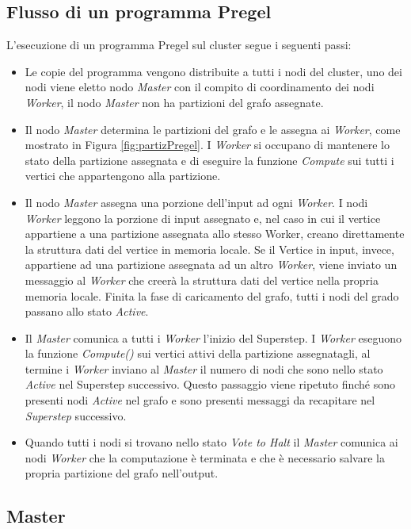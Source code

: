 \documentclass[LaM,binding=0.6cm]{sapthesis}
\begin{document}
\subsection{Flusso di un programma Pregel}

L'esecuzione di un programma Pregel sul cluster segue i seguenti passi:
\begin{itemize}
\item Le copie del programma vengono distribuite a tutti i nodi del cluster, uno dei nodi viene eletto nodo \textit{Master} con il compito di coordinamento dei nodi \textit{Worker}, il nodo \textit{Master }non ha partizioni del grafo assegnate.
\item Il nodo \textit{Master} determina le partizioni del grafo e le assegna ai \textit{Worker}, come  mostrato in Figura \ref{fig:partizPregel}. I \textit{Worker} si occupano di mantenere lo stato della partizione assegnata e di eseguire la funzione \textit{Compute} sui tutti i vertici che appartengono alla partizione. 
\item Il nodo \textit{Master} assegna una porzione dell’input ad ogni \textit{Worker}. I nodi \textit{Worker} leggono la porzione di input assegnato e, nel caso in cui il vertice appartiene a una partizione assegnata allo stesso Worker, creano direttamente la struttura dati del vertice in memoria locale. Se il Vertice in input, invece, appartiene ad una partizione assegnata ad un altro \textit{Worker}, viene inviato un messaggio al \textit{Worker} che creerà la struttura dati del vertice nella propria memoria locale. Finita la fase di caricamento del grafo, tutti i nodi del grado passano allo stato \textit{Active}.
\item Il \textit{Master} comunica a tutti i \textit{Worker} l'inizio del Superstep. I \textit{Worker} eseguono la funzione \textit{Compute()} sui vertici attivi della  partizione assegnatagli, al termine i \textit{Worker} inviano al \textit{Master} il numero di nodi che sono nello stato \textit{Active} nel Superstep successivo. Questo passaggio viene ripetuto finché sono presenti nodi \textit{Active} nel grafo e sono presenti messaggi da recapitare nel \textit{Superstep} successivo.
\item Quando tutti i nodi si trovano nello stato \textit{Vote to Halt} il \textit{Master} comunica ai nodi \textit{Worker} che la computazione è terminata e che è necessario salvare la propria partizione del grafo nell'output.
\end{itemize}

\subsection{Master}
\end{document}
